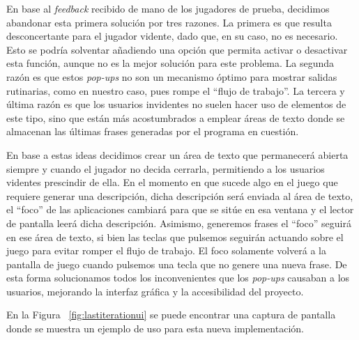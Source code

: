 En base al \textit{feedback} recibido de mano de los jugadores de prueba, decidimos abandonar esta primera solución por tres razones. La primera es que resulta desconcertante para el jugador vidente, dado que, en su caso, no es necesario. Esto se podría solventar añadiendo una opción que permita activar o desactivar esta función, aunque no es la mejor solución para este problema.
La segunda razón es que estos \textit{pop-ups} no son un mecanismo óptimo para mostrar salidas rutinarias, como en nuestro caso, pues rompe el ``flujo de trabajo''.
La tercera y última razón es que los usuarios invidentes no suelen hacer uso de elementos de este tipo, sino que están más acostumbrados a emplear áreas de texto donde se almacenan las últimas frases generadas por el programa en cuestión.

En base a estas ideas decidimos crear un área de texto que permanecerá abierta siempre y cuando el jugador no decida cerrarla, permitiendo a los usuarios videntes prescindir de ella. En el momento en que sucede algo en el juego que requiere generar una descripción, dicha descripción será enviada al área de texto, el ``foco'' de las aplicaciones cambiará para que se sitúe en esa ventana y el lector de pantalla leerá dicha descripción. Asimismo, generemos frases el ``foco'' seguirá en ese área de texto, si bien las teclas que pulsemos seguirán actuando sobre el juego para evitar romper el flujo de trabajo. El foco solamente volverá a la pantalla de juego cuando pulsemos una tecla que no genere una nueva frase.
De esta forma solucionamos todos los inconvenientes que los \textit{pop-ups} causaban a los usuarios, mejorando la interfaz gráfica y la accesibilidad del proyecto.

En la Figura ~\ref{fig:lastiterationui} se puede encontrar una captura de pantalla donde se muestra un ejemplo de uso para esta nueva implementación.

